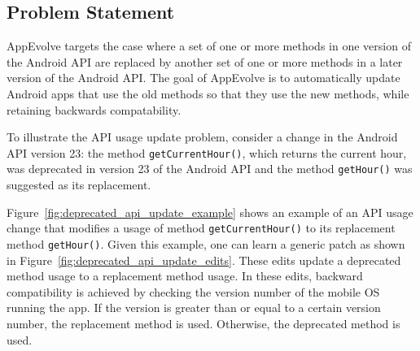 
\subsection{Problem Statement}\label{sec:problem}

AppEvolve targets the case where a set of one or more methods in one
version of the Android API are replaced by another set of one or more
methods in a later version of the Android API.  The goal of AppEvolve is to
automatically update Android apps that use the old methods so that they use
the new methods, while retaining backwards compatability.


To illustrate the API usage update problem, consider a change in the
Android API version 23: the method \texttt{getCurrentHour()}, which returns
the current hour, was deprecated in version 23 of the Android API and the
method \texttt{getHour()} was suggested as its replacement.

Figure~\ref{fig:deprecated_api_update_example} shows an example of an API
usage change that modifies a usage of method \texttt{getCurrentHour()} to
its replacement method \texttt{getHour()}. Given this example, one can
learn a generic patch as shown in
Figure~\ref{fig:deprecated_api_update_edits}. These edits update a
deprecated method usage to a replacement method usage. In these edits,
backward compatibility is achieved by checking the version number of the
mobile OS running the app. If the version is greater than or equal to a
certain version number, the replacement method is used. Otherwise, the
deprecated method is used.

